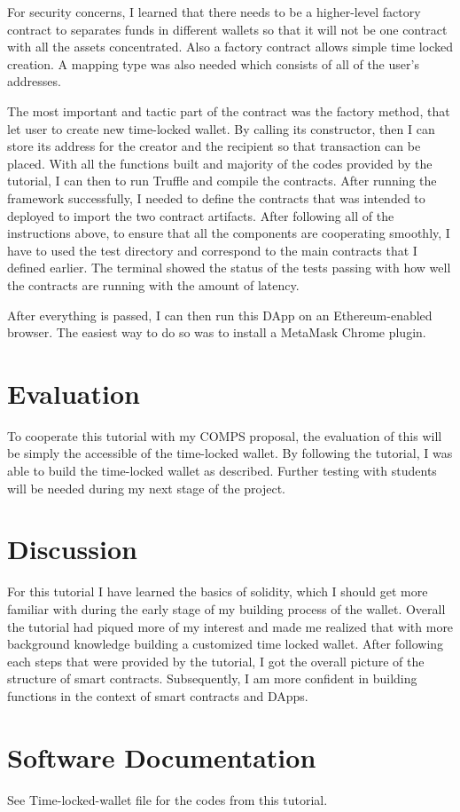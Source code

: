 \documentclass[10pt,twocolumn]{article}
\begin{document}
For security concerns, I learned that there needs to be a higher-level factory contract to separates funds in different wallets so that it will not be one contract with all the assets concentrated. Also a factory contract allows simple time locked creation. A mapping type was also needed which consists of all of the user's addresses.

The most important and tactic part of the contract was the factory method, that let user to create new time-locked wallet. By calling its constructor, then I can store its address for the creator and the recipient so that transaction can be placed. With all the functions built and majority of the codes provided by the tutorial, I can then to run Truffle and compile the contracts. After running the framework successfully, I needed to define the contracts that was intended to deployed to import the two contract artifacts. After following all of the instructions above, to ensure that all the components are cooperating smoothly, I have to used the test directory and correspond to the main contracts that I defined earlier. The terminal showed the status of the tests passing with how well the contracts are running with the amount of latency.

After everything is passed, I can then run this DApp on an Ethereum-enabled browser. The easiest way to do so was to install a MetaMask Chrome plugin.

\section{Evaluation}

To cooperate this tutorial with my COMPS proposal, the evaluation of this will be simply the accessible of the time-locked wallet. By following the tutorial, I was able to build the time-locked wallet as described. Further testing with students will be needed during my next stage of the project.

\section{Discussion}

For this tutorial I have learned the basics of solidity, which I should get more familiar with during the early stage of my building process of the wallet. Overall the tutorial had piqued more of my interest and made me realized that with more background knowledge building a customized time locked wallet. After following each steps that were provided by the tutorial, I got the overall picture of the structure of smart contracts. Subsequently, I am more confident in building functions in the context of smart contracts and DApps.



\section{Software Documentation}

See Time-locked-wallet file for the codes from this tutorial.

\printbibliography
\end{document}
